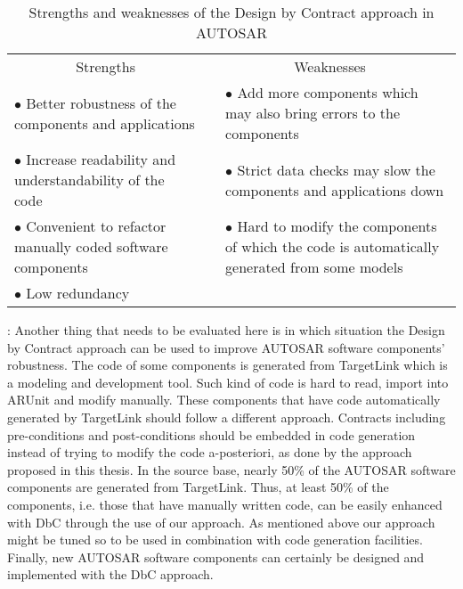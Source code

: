 

\begin{table*}[htb]
\centering
\begin{tabular}{p{7.5cm} l p{9cm}}
\hline
\multicolumn{1}{c}{Strengths} & \multicolumn{2}{c}{Weaknesses  } \\
[.1ex]
\cline{1-1}  \cline{3-3} 
$\bullet$ Better robustness of the components and applications  &  & $\bullet$ Add more components which may also bring errors to the components \\
[.8ex]

$\bullet$ Increase readability and understandability of the code   &  & $\bullet$ Strict data checks may slow the components and applications down  \\
[.8ex]

$\bullet$ Convenient to refactor manually coded software components  &  & $\bullet$ Hard to modify the components of which the code is automatically  generated from some models \\
[-1.6ex]

$\bullet$ Low redundancy &  &          \\

\hline
\end{tabular}
\caption{Strengths and weaknesses of the Design by Contract approach in AUTOSAR}
\label{tab:strenghtsWeaknesses}
\vspace{-.6cm}
\end{table*}


: Another thing that needs to be evaluated here is in which situation the Design by Contract approach can be used to improve AUTOSAR software components' robustness. %
The code of some components is generated from TargetLink which is a modeling and development tool. Such kind of code is hard to read, import into ARUnit and modify manually. These components that have code automatically generated by TargetLink should follow a different approach. Contracts including pre-conditions and post-conditions should be embedded in code generation instead of trying to modify the code a-posteriori, as done by the approach proposed in this thesis. In the source base, nearly 50\% of the AUTOSAR software components are generated from TargetLink. Thus, at least 50\% of the components, i.e. those that have manually written code, can be easily enhanced with DbC through the use of our approach. %
As mentioned above our approach might be tuned so to be used in combination with code generation facilities. 
Finally, new AUTOSAR software components can certainly be designed and implemented with the DbC approach.

